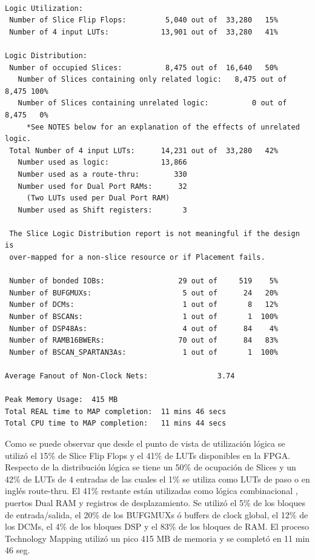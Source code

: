 \begin{lstlisting}[frame=single,caption={Resumen de utilización - MinSoC},label={lst:resultparminsoc},breaklines]

Logic Utilization:
 Number of Slice Flip Flops:         5,040 out of  33,280   15%
 Number of 4 input LUTs:            13,901 out of  33,280   41%

Logic Distribution:
 Number of occupied Slices:          8,475 out of  16,640   50%
   Number of Slices containing only related logic:   8,475 out of   8,475 100%
   Number of Slices containing unrelated logic:          0 out of   8,475   0%
     *See NOTES below for an explanation of the effects of unrelated logic.
 Total Number of 4 input LUTs:      14,231 out of  33,280   42%
   Number used as logic:            13,866
   Number used as a route-thru:        330
   Number used for Dual Port RAMs:      32
     (Two LUTs used per Dual Port RAM)
   Number used as Shift registers:       3

 The Slice Logic Distribution report is not meaningful if the design is
 over-mapped for a non-slice resource or if Placement fails.

 Number of bonded IOBs:                 29 out of     519    5%
 Number of BUFGMUXs:                     5 out of      24   20%
 Number of DCMs:                         1 out of       8   12%
 Number of BSCANs:                       1 out of       1  100%
 Number of DSP48As:                      4 out of      84    4%
 Number of RAMB16BWERs:                 70 out of      84   83%
 Number of BSCAN_SPARTAN3As:             1 out of       1  100%

Average Fanout of Non-Clock Nets:                3.74

Peak Memory Usage:  415 MB
Total REAL time to MAP completion:  11 mins 46 secs 
Total CPU time to MAP completion:   11 mins 44 secs 

\end{lstlisting}

	Como se puede observar que desde el punto de vista de utilización lógica se utilizó el 15\% de Slice Flip Flops y el 41\% de LUTs disponibles en
	la FPGA. Respecto de la distribución lógica se tiene un 50\% de ocupación de Slices y un 42\% de LUTs de 4 entradas de las cuales el 1\% se utiliza
	como LUTs de paso o en inglés route-thru. El 41\% restante están utilizadas como lógica combinacional , puertos Dual RAM y registros de
	desplazamiento. Se utilizó el 5\% de los bloques de entrada/salida, el 20\% de los BUFGMUXs ó buffers de clock global, el 12\% de los DCMs, el 4\% de
	los bloques DSP y el 83\% de los bloques de RAM. El proceso Technology Mapping utilizó un pico 415 MB de memoria y se completó en 11 min 46 seg. 
	

